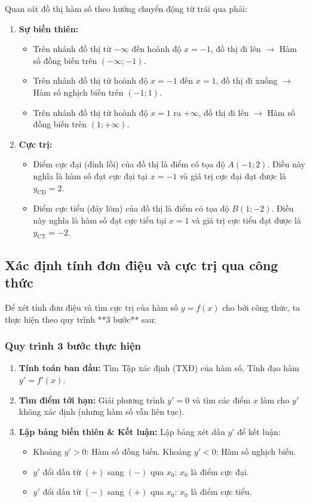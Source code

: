 \documentclass[12pt]{article}
\begin{document}
	\begin{loigiai}
		Quan sát đồ thị hàm số theo hướng chuyển động từ trái qua phải:
		\begin{enumerate}[label=-]
			\item \textbf{Sự biến thiên:}
			\begin{itemize}
				\item Trên nhánh đồ thị từ $-\infty$ đến hoành độ $x = -1$, đồ thị đi lên $\rightarrow$ Hàm số đồng biến trên $(-\infty; -1)$.
				\item Trên nhánh đồ thị từ hoành độ $x = -1$ đến $x = 1$, đồ thị đi xuống $\rightarrow$ Hàm số nghịch biến trên $(-1; 1)$.
				\item Trên nhánh đồ thị từ hoành độ $x = 1$ ra $+\infty$, đồ thị đi lên $\rightarrow$ Hàm số đồng biến trên $(1; +\infty)$.
			\end{itemize}
			\item \textbf{Cực trị:}
			\begin{itemize}
				\item Điểm cực đại (đỉnh lồi) của đồ thị là điểm có tọa độ $A(-1; 2)$. Điều này nghĩa là hàm số đạt cực đại tại $x = -1$ và giá trị cực đại đạt được là $y_{\text{CĐ}} = 2$.
				\item Điểm cực tiểu (đáy lõm) của đồ thị là điểm có tọa độ $B(1; -2)$. Điều này nghĩa là hàm số đạt cực tiểu tại $x = 1$ và giá trị cực tiểu đạt được là $y_{\text{CT}} = -2$.
			\end{itemize}
		\end{enumerate}
	\end{loigiai}
	
	
	\subsection{Xác định tính đơn điệu và cực trị qua công thức}
	
	Để xét tính đơn điệu và tìm cực trị của hàm số $y = f(x)$ cho bởi công thức, ta thực hiện theo quy trình **3 bước** sau:
	
	\subsubsection{Quy trình 3 bước thực hiện}
	\begin{enumerate}[label=\textbf{Bước \arabic*:}]
		\item \textbf{Tính toán ban đầu:} Tìm Tập xác định (TXĐ) của hàm số. Tính đạo hàm $y' = f'(x)$.
		\item \textbf{Tìm điểm tới hạn:} Giải phương trình $y' = 0$ và tìm các điểm $x$ làm cho $y'$ không xác định (nhưng hàm số vẫn liên tục).
		\item \textbf{Lập bảng biến thiên \& Kết luận:} Lập bảng xét dấu $y'$ để kết luận:
		\begin{itemize}
			\item Khoảng $y' > 0$: Hàm số đồng biến. Khoảng $y' < 0$: Hàm số nghịch biến.
			\item $y'$ đổi dấu từ $(+)$ sang $(-)$ qua $x_0$: $x_0$ là điểm cực đại.
			\item $y'$ đổi dấu từ $(-)$ sang $(+)$ qua $x_0$: $x_0$ là điểm cực tiểu.
		\end{itemize}
	\end{enumerate}
	
\end{document}
